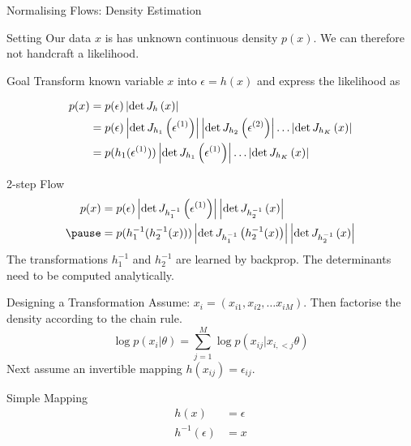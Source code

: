 \documentclass[14pt]{beamer}
\begin{document}
\begin{frame}{Normalising Flows: Density Estimation}
\begin{block}{Setting}
Our data $ x $ is has unknown continuous density $ p(x) $.
We can therefore not handcraft a likelihood.
\end{block}
\begin{block}{Goal}
Transform known variable $ x $ into $ \epsilon = h(x) $ and express the likelihood as
\begin{small}
\begin{equation*}
\begin{aligned}
p(x) &= p(\epsilon)\left|\det J_{h}\left(x\right)\right| \\
&= p(\epsilon)\left|\det J_{h_{1}}\left(\epsilon^{(1)}\right)\right|\left|\det J_{h_{2}}\left(\epsilon^{(2)}\right)\right|\ldots \left|\det J_{h_{K}}\left(x\right)\right| \\
&= p(h_{1}(\epsilon^{(1)}))\left|\det J_{h_{1}}\left(\epsilon^{(1)}\right)\right|\ldots \left|\det J_{h_{K}}\left(x\right)\right|
\end{aligned}
\end{equation*}
\end{small}
\end{block}
\end{frame}

\begin{frame}{2-step Flow}
\begin{equation*}
\begin{aligned}
p(x) &= p(\epsilon)\abs{\det\jacob{h_{1}^{-1}}{\epsilon^{(1)}}}\abs{\det\jacob{h_{2}^{-1}}{x}} \\ \pause
&= p(h_{1}^{-1}(h_{2}^{-1}(x)))\abs{\det\jacob{h_{1}^{-1}}{h_{2}^{-1}(x)}}\abs{\det\jacob{h_{2}^{-1}}{x}}
\end{aligned}
\end{equation*}
\pause
The transformations $ h^{-1}_{1} $ and $ h^{-1}_{2} $ are learned by backprop. The determinants need to be computed analytically.
\end{frame}

\begin{frame}{Designing a Transformation}
Assume: $ x_{i} = (x_{i1}, x_{i2}, \ldots x_{iM}) $.
Then factorise the density according to the chain rule.
\begin{equation*}
\log p(x_{i}|\theta) = \sum_{j=1}^{M} \log p(x_{ij}|x_{i,<j}\theta)
\end{equation*}
Next assume an invertible mapping $ h(x_{ij}) = \epsilon_{ij} $.
\begin{block}{Simple Mapping}
\begin{equation*}
\begin{aligned}
h(x) &= \epsilon \\
h^{-1}(\epsilon) &= x
\end{aligned}
\end{equation*}
\end{block}
\end{frame}
\end{document}
